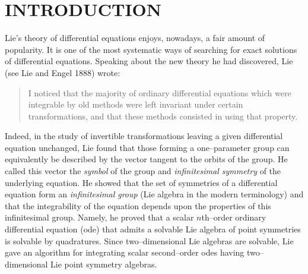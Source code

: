 %

\chapter*{\hspace{3cm} INTRODUCTION}
Lie's theory of differential equations enjoys, nowadays, a fair amount of
popularity. It
is one of the most systematic ways of searching for exact solutions
of differential equations. Speaking about the new theory he had discovered,
Lie (see Lie and Engel 1888) wrote:
\begin{quote}
I noticed
that the majority of ordinary differential equations which were integrable
by old methods were left invariant under certain transformations, and that
these methods consisted in using that property.
\end{quote}
Indeed, in the study of
invertible transformations leaving a given differential equation unchanged,
Lie found that those forming a one--parameter group can 
equivalently be described by the vector tangent to the orbits of the group.
He called this vector the {\em symbol} of the group and
{\em infinitesimal symmetry} of the
underlying equation. He showed that the set of symmetries of a  differential
equation form an {\em infinitesimal group} (Lie algebra in the modern
terminology) and  that the integrability of the equation depends upon the
properties of this infinitesimal group. Namely, he proved that a scalar
$n$th--order ordinary differential equation (ode) that admits a solvable Lie algebra
of point symmetries is solvable by quadratures. Since two--dimensional Lie algebras
are solvable, Lie gave an algorithm for integrating scalar second--order odes
having two--dimensional Lie point symmetry  algebras.

